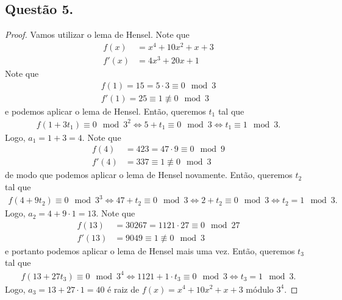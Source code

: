 \documentclass[a4paper,12pt]{article}
\theoremstyle{definition}
\begin{document}
	\subsection*{Questão 5.}
	\begin{proof}
		Vamos utilizar o lema de Hensel. Note que
		\begin{align*}
		f(x) &= x^4 + 10x^2 + x + 3 \\
		f'(x) &= 4x^3 + 20x + 1
		\end{align*}
		Note que 
		\begin{align*}
		f(1) = 15 = 5\cdot 3\equiv 0\mod 3 \\
		f'(1) = 25\equiv 1\not\equiv 0\mod 3
		\end{align*}
		e podemos aplicar o lema de Hensel. Então, queremos $t_1$ tal que
		\begin{align*}
		f(1 + 3t_1) \equiv 0\mod 3^2 \Leftrightarrow 5 + t_1\equiv 0\mod 3\Leftrightarrow t_1\equiv 1\mod 3.
		\end{align*}
		Logo, $a_1 = 1 + 3 = 4$. Note que
		\begin{align*}
		f(4) &= 423 = 47\cdot 9\equiv 0\mod 9 \\
		f'(4) &= 337 \equiv 1\not\equiv 0\mod 3
		\end{align*}
		de modo que podemos aplicar o lema de Hensel novamente. Então, queremos $t_2$ tal que
		\begin{align*}
		f(4+9t_2)\equiv 0\mod 3^3 \Leftrightarrow 47 + t_2\equiv 0\mod 3 \Leftrightarrow 2 + t_2\equiv 0\mod 3 \Leftrightarrow t_2 = 1\mod 3.
		\end{align*}
		Logo, $a_2 = 4 + 9\cdot 1 = 13$. Note que
		\begin{align*}
		f(13) &= 30267 = 1121\cdot 27\equiv 0\mod 27 \\
		f'(13) &= 9049 \equiv 1\not\equiv 0\mod 3
		\end{align*}
		e portanto podemos aplicar o lema de Hensel mais uma vez. Então, queremos $t_3$ tal que
		\begin{align*}
		f(13+27t_3)\equiv 0\mod 3^4\Leftrightarrow 1121 + 1\cdot t_3\equiv 0\mod 3 \Leftrightarrow t_3 = 1\mod 3.
		\end{align*}
		Logo, $a_3 = 13 + 27\cdot 1 = 40$ é raiz de $f(x) = x^4 + 10x^2 + x + 3$ módulo $3^4$.  
	\end{proof}
	
	
	
	
	
	
	
	
	
	
\end{document}
